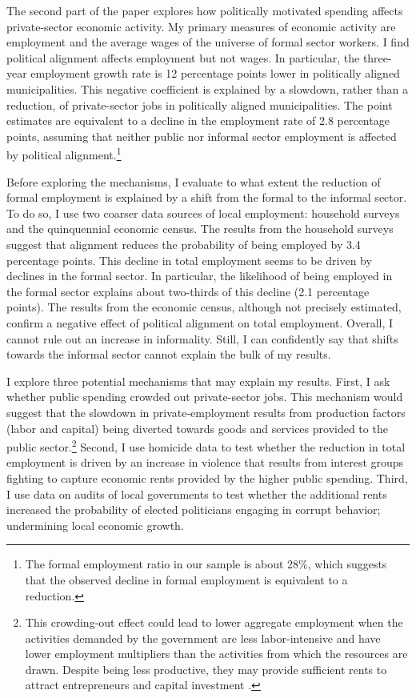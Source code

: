 \documentclass[dv_diss_main.tex]{subfiles}
\begin{document}
The second part of the paper explores how politically motivated spending affects private-sector economic activity.
My primary measures of economic activity are employment and the average wages of the universe of formal sector workers.
I find political alignment affects employment but not wages. In particular, the three-year employment growth rate is 12 percentage points lower in politically aligned municipalities. This negative coefficient is explained by a slowdown, rather than a reduction, of private-sector jobs in politically aligned municipalities. The point estimates are equivalent to a decline in the employment rate of 2.8  percentage points, assuming that neither public nor informal sector employment is affected by political alignment.\footnote{The formal employment ratio in our sample is about 28\%, which suggests that the observed decline in formal employment is equivalent to a reduction.}

Before exploring the mechanisms, I evaluate to what extent the reduction of formal employment is explained by a shift from the formal to the informal sector. 
To do so, I use two coarser data sources of local employment: household surveys and the quinquennial economic census. 
The results from the household surveys suggest that alignment reduces the probability of being employed by 3.4 percentage points. This decline in total employment seems to be driven by declines in the formal sector. In particular, the likelihood of being employed in the formal sector explains about two-thirds of this decline (2.1 percentage points).
The results from the economic census, although not precisely estimated, confirm a negative effect of political alignment on total employment. 
Overall, I cannot rule out an increase in informality. Still, I can confidently say that shifts towards the informal sector cannot explain the bulk of my results.

I explore three potential mechanisms that may explain my results. First, I ask whether public spending crowded out private-sector jobs. This mechanism would suggest that the slowdown in private-employment results from production factors (labor and capital) being diverted towards goods and services provided to the public sector.\footnote{
This crowding-out effect could lead to lower aggregate employment when the activities demanded by the government are less labor-intensive and have lower employment multipliers than the activities from which the resources are drawn. Despite being less productive, they may provide sufficient rents to attract entrepreneurs and capital investment \citep{torvik2002natural}.} 
Second, I use homicide data to test whether the reduction in total employment is driven by an increase in violence that results from interest groups fighting to capture economic rents provided by the higher public spending.
Third, I use data on audits of local governments to test whether the additional rents increased the probability of elected politicians engaging in corrupt behavior; undermining local economic growth. 
\end{document}
